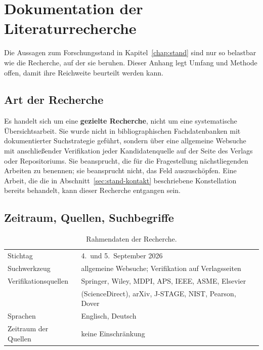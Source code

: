 \documentclass[12pt,a4paper]{report}
\begin{document}

\chapter{Dokumentation der Literaturrecherche}
\label{app:recherche}

Die Aussagen zum Forschungsstand in Kapitel~\ref{chap:stand} sind nur so
belastbar wie die Recherche, auf der sie beruhen. Dieser Anhang legt
Umfang und Methode offen, damit ihre Reichweite beurteilt werden kann.

\section{Art der Recherche}

Es handelt sich um eine \textbf{gezielte Recherche}, nicht um eine
systematische Übersichtsarbeit. Sie wurde nicht in bibliographischen
Fachdatenbanken mit dokumentierter Suchstrategie geführt, sondern über
eine allgemeine Websuche mit anschließender Verifikation jeder
Kandidatenquelle auf der Seite des Verlags oder Repositoriums. Sie
beansprucht, die für die Fragestellung nächstliegenden Arbeiten zu
benennen; sie beansprucht nicht, das Feld auszuschöpfen. Eine Arbeit,
die die in Abschnitt~\ref{sec:stand-kontakt} beschriebene Konstellation
bereits behandelt, kann dieser Recherche entgangen sein.

\section{Zeitraum, Quellen, Suchbegriffe}

\begin{table}[htbp]
  \centering
  \begin{tabular}{ll}
    \hline
    Stichtag & 4.\ und 5.\ September 2026 \\
    Suchwerkzeug & allgemeine Websuche; Verifikation auf Verlagsseiten \\
    Verifikationsquellen & Springer, Wiley, MDPI, APS, IEEE, ASME, Elsevier \\
                         & (ScienceDirect), arXiv, J-STAGE, NIST, Pearson, Dover \\
    Sprachen & Englisch, Deutsch \\
    Zeitraum der Quellen & keine Einschränkung \\
    \hline
  \end{tabular}
  \caption{Rahmendaten der Recherche.}
\end{table}
\end{document}
